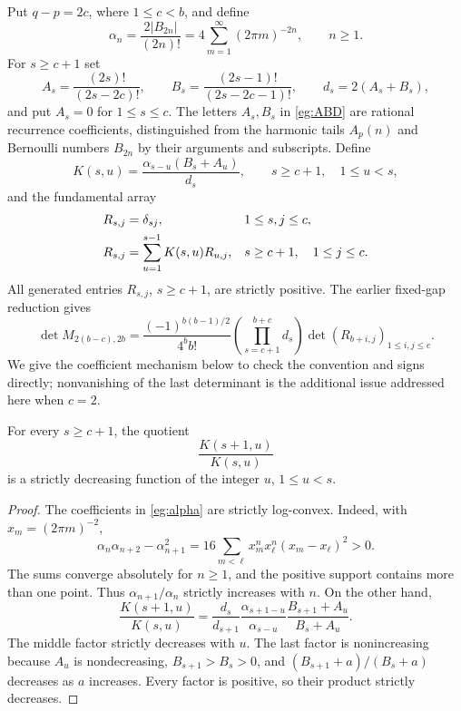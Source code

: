 Put $q-p=2c$, where $1\le c<b$, and define
\begin{equation}\label{eg:alpha}
 \alpha_n=\frac{2|B_{2n}|}{(2n)!}
          =4\sum_{m=1}^{\infty}(2\pi m)^{-2n},\qquad n\ge1.
\end{equation}
For $s\ge c+1$ set
\begin{equation}\label{eg:ABD}
 A_s=\frac{(2s)!}{(2s-2c)!},\qquad
 B_s=\frac{(2s-1)!}{(2s-2c-1)!},\qquad
 d_s=2(A_s+B_s),
\end{equation}
and put $A_s=0$ for $1\le s\le c$. The letters $A_s,B_s$ in
\eqref{eg:ABD} are rational recurrence coefficients, distinguished from
the harmonic tails $A_p(n)$ and Bernoulli numbers $B_{2n}$ by their
arguments and subscripts. Define
\begin{equation}\label{eg:kernel}
 K(s,u)=\frac{\alpha_{s-u}(B_s+A_u)}{d_s},
 \qquad s\ge c+1,\quad1\le u<s,
\end{equation}
and the fundamental array
\begin{align}
 R_{s,j}&=\delta_{sj},&&1\le s,j\le c,\notag\\
 R_{s,j}&=\sum_{u=1}^{s-1}K(s,u)R_{u,j},
       &&s\ge c+1,\quad1\le j\le c.
       \label{eg:fundamental}
\end{align}
All generated entries $R_{s,j}$, $s\ge c+1$, are strictly positive.
The earlier fixed-gap reduction gives
\begin{equation}\label{eg:inherited-reduction}
 \det M_{2(b-c),2b}
 =\frac{(-1)^{b(b-1)/2}}{4^bb!}
    \left(\prod_{s=c+1}^{b+c}d_s\right)
    \det(R_{b+i,j})_{1\le i,j\le c}.
\end{equation}
We give the coefficient mechanism below to check the convention and
signs directly; nonvanishing of the last determinant is the additional
issue addressed here when $c=2$.

\begin{lemma}\label{eg:kernel-ratios}
For every $s\ge c+1$, the quotient
\[
                   \frac{K(s+1,u)}{K(s,u)}
\]
is a strictly decreasing function of the integer $u$, $1\le u<s$.
\end{lemma}

\begin{proof}
The coefficients in \eqref{eg:alpha} are strictly log-convex. Indeed,
with $x_m=(2\pi m)^{-2}$,
\[
 \alpha_n\alpha_{n+2}-\alpha_{n+1}^2
 =16\sum_{m<\ell}x_m^nx_\ell^n(x_m-x_\ell)^2>0.
\]
The sums converge absolutely for $n\ge1$, and the positive support
contains more than one point. Thus $\alpha_{n+1}/\alpha_n$ strictly
increases with $n$. On the other hand,
\[
 \frac{K(s+1,u)}{K(s,u)}
 =\frac{d_s}{d_{s+1}}
   \frac{\alpha_{s+1-u}}{\alpha_{s-u}}
   \frac{B_{s+1}+A_u}{B_s+A_u}.
\]
The middle factor strictly decreases with $u$. The last factor is
nonincreasing because $A_u$ is nondecreasing, $B_{s+1}>B_s>0$,
and $(B_{s+1}+a)/(B_s+a)$ decreases as $a$ increases. Every factor
is positive, so their product strictly decreases.
\end{proof}

